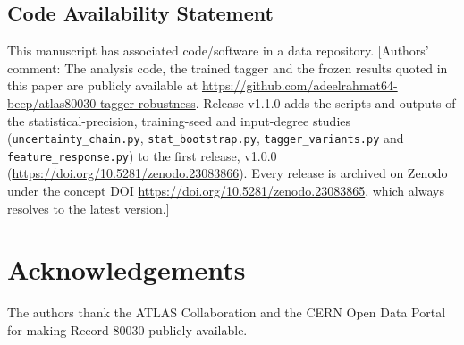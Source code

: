 \documentclass[pdflatex,sn-mathphys,Numbered,iicol]{sn-jnl}
\begin{document}
\subsection*{Code Availability Statement}

This manuscript has associated code/software in a data repository. [Authors' comment:
The analysis code, the trained tagger and the frozen results quoted in this paper are
publicly available at
\url{https://github.com/adeelrahmat64-beep/atlas80030-tagger-robustness}. Release
v1.1.0 adds the scripts and outputs of the statistical-precision, training-seed and
input-degree studies (\texttt{uncertainty\_chain.py}, \texttt{stat\_bootstrap.py},
\texttt{tagger\_variants.py} and \texttt{feature\_response.py}) to the first release,
v1.0.0 (\url{https://doi.org/10.5281/zenodo.23083866}). Every release is archived on
Zenodo under the concept DOI \url{https://doi.org/10.5281/zenodo.23083865}, which
always resolves to the latest version.]

\section*{Acknowledgements}

The authors thank the ATLAS Collaboration and the CERN Open Data Portal for making
Record 80030 publicly available.
\end{document}
